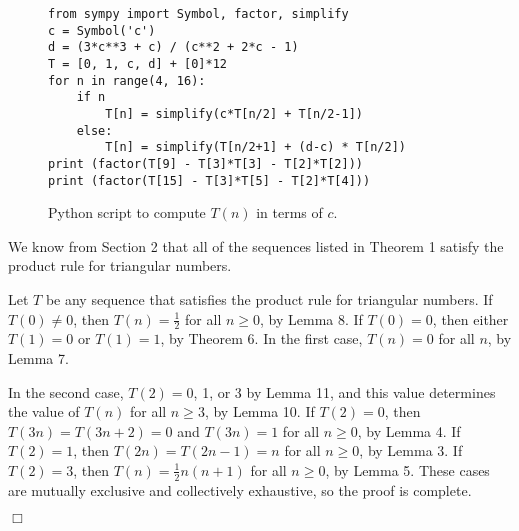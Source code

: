 \documentclass[11pt,fleqn]{amsart}
\begin{document}
\begin{figure}
\begin{lstlisting}[frame=single]
from sympy import Symbol, factor, simplify
c = Symbol('c')
d = (3*c**3 + c) / (c**2 + 2*c - 1)
T = [0, 1, c, d] + [0]*12
for n in range(4, 16):
    if n 
        T[n] = simplify(c*T[n/2] + T[n/2-1])
    else:
        T[n] = simplify(T[n/2+1] + (d-c) * T[n/2])
print (factor(T[9] - T[3]*T[3] - T[2]*T[2]))
print (factor(T[15] - T[3]*T[5] - T[2]*T[4]))
\end{lstlisting}
\caption{Python script to compute $T(n)$ in terms of $c$.}
\end{figure}

We know from Section 2 that all of the sequences listed in Theorem 1 satisfy the product rule
for triangular numbers.

Let $T$ be any sequence that satisfies the product rule for triangular numbers.
If $T(0) \ne 0$, then $T(n) = \frac12$ for all $n\ge0$, by Lemma 8.
If $T(0) = 0$, then either $T(1) = 0$ or $T(1) = 1$, by Theorem 6.
In the first case, $T(n) = 0$ for all $n$, by Lemma 7.

In the second case, $T(2) = 0$, 1, or 3 by  Lemma 11, and this value determines
the value of $T(n)$ for all $n \ge 3$, by Lemma 10.
If $T(2) = 0$, then $T(3n)=T(3n+2)=0$ and $T(3n)=1$ for all $n\ge0$, by Lemma 4.
If $T(2) = 1$, then $T(2n) = T(2n-1) = n$ for all $n \ge 0$, by Lemma 3.
If $T(2) = 3$, then $T(n) = \frac12 n(n+1)$ for all $n\ge0$, by Lemma 5.
These cases are mutually exclusive and collectively exhaustive, so the proof is complete.

\hfill$\Box$

{}

\end{document}
